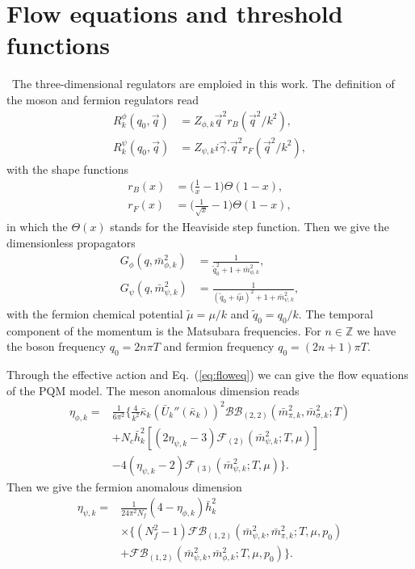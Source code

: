 \documentclass[%
reprint,
superscriptaddress,
showpacs,preprintnumbers,
 amsmath,amssymb,
 aps,
prd,
]{revtex4-1}
\def\Eq#1{Eq.~(\ref{#1})}
\begin{document}
\section{Flow equations and threshold functions}\
The three-dimensional regulators are emploied in this work. The definition of the moson and fermion regulators read
\begin{align}
R^\phi_k(q_0,\vec{q})&=Z_{\phi,k}\vec{q}^2 r_B(\vec{q}^2/k^2),\nonumber\\[2ex]
R^\psi_k(q_0,\vec{q})&=Z_{\psi,k}i\vec\gamma.\vec{q}^2 r_F(\vec{q}^2/k^2),
\end{align}
with the shape functions
\begin{align}
r_B(x)&=\big(\frac{1}{x}-1\big)\Theta(1-x),\nonumber\\[2ex]
r_F(x)&=\big(\frac{1}{\sqrt{x}}-1\big)\Theta(1-x),
\end{align}
in which the $\Theta(x)$ stands for the Heaviside step function. Then we give the dimensionless propagators
\begin{align}
G_\phi(q,\bar{m}^2_{\phi,k})&=\frac{1}{\tilde{q}^2_0+1+\bar{m}^2_{\phi,k}},\nonumber\\[2ex]
G_\psi(q,\bar{m}^2_{\psi,k})&=\frac{1}{(\tilde{q}_0+i\tilde{\mu})^2+1+\bar{m}^2_{\psi,k}},
\end{align}
with the fermion chemical potential $\tilde{\mu}=\mu/k$ and $\tilde{q}_0=q_0/k$. The temporal component of the momentum is the Matsubara frequencies. For $n\in\mathbb{Z}$ we have the boson frequency $q_0=2n\pi T$ and fermion frequency $q_0=(2n+1)\pi T$.\par
Through the effective action and \Eq{eq:floweq} we can give the flow equations of the PQM model. The meson anomalous dimension reads
\begin{align}
\eta_{\phi,k}=&\frac{1}{6\pi^2}\bigg\{\frac{4}{k^2}\bar\kappa_k(\bar U_k''(\bar\kappa_k))^2\mathcal{BB}_{(2,2)}(\bar m^2_{\pi,k},\bar m^2_{\sigma,k};T)\nonumber\\[2ex]
&+N_c\bar h^2_k[(2\eta_{\psi,k}-3)\mathcal{F}_{(2)}(\bar m^2_{\psi,k};T,\mu)]\nonumber\\[2ex]
&-4(\eta_{\psi,k}-2)\mathcal{F}_{(3)}(\bar m^2_{\psi,k};T,\mu)\bigg\}.
\end{align}
Then we give the fermion anomalous dimension
\begin{align}
\eta_{\psi,k}=&\frac{1}{24\pi^2 N_f}(4-\eta_{\phi,k})\bar h^2_k\nonumber\\[2ex]
&\times \bigg\{ (N_f^2-1)\mathcal{FB}_{(1,2)}(\bar m^2_{\psi,k},\bar m^2_{\pi,k};T,\mu,p_0)\nonumber\\[2ex]
&+\mathcal{FB}_{(1,2)}(\bar m^2_{\psi,k},\bar m^2_{\phi,k};T,\mu,p_0)\bigg\}.
\end{align}
\end{document}
